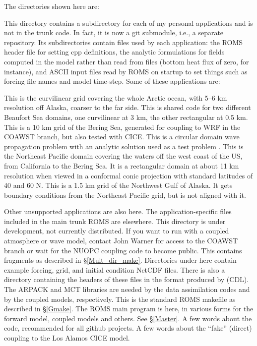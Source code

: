The directories shown here are:
\begin{klist}
   This directory contains a subdirectory for each of
  my personal applications and is not in the trunk code. In fact,
  it is now a git submodule, i.e., a separate repository. Its
  subdirectories contain files used by each application: the ROMS
  header file for setting cpp definitions, the analytic formulations
  for fields computed in the model rather than read from files
  (bottom heat flux of zero, for instance), and ASCII input files
  read by ROMS on startup to set things such as forcing file names
  and model time-step. Some of these applications are:
\begin{klist}
   This is the curvilinear grid covering the whole
    Arctic ocean, with 5--6 km resolution off Alaska, coarser to the
    far side.
   This is shared code for two different Beaufort Sea
    domains, one curvilinear at 3 km, the other rectangular at 0.5 km.
   This is a 10 km grid of the Bering Sea, generated for
    coupling to WRF in the COAWST branch, but also tested with CICE.
   This is a circular domain wave propagation problem
    with an analytic solution used as a test problem \citep{Lamb32}.
   This is the Northeast Pacific domain covering the
    waters off the west coast of the US, from California to the
    Bering Sea. It is a rectangular domain at about 11 km resolution
    when viewed in a conformal conic projection with standard
    latitudes of 40 and 60 N.
   This is a 1.5 km grid of the Northwest Gulf of Alaska. It
    gets boundary conditions from the Northeast Pacific grid, but
    is not aligned with it.
\end{klist}
  Other unsupported applications are also here. The application-specific
  files included in the main trunk ROMS are elsewhere.
   This directory is under development, not
    currently distributed. If you want to run with a coupled atmosphere
    or wave model, contact John Warner for access to the COAWST
    branch or wait for the NUOPC coupling code to become public.
   This contains  fragments as described in
    \S\ref{Mult_dir_make}.
   Directories under here contain example forcing, grid,
    and initial condition NetCDF files. There is also a directory
    containing the headers of these files in the format produced
    by  (CDL).
   The ARPACK and MCT libraries are needed by the data
    assimilation codes and by the coupled models, respectively.
   This is the standard ROMS makefile as described
    in \S\ref{Gmake}.
   The ROMS main program is here, in various forms for
    the forward model, coupled models and others. See \S\ref{Master}.
   A few words about the code, recommended for all github
    projects.
   A few words about the ``fake'' (direct) coupling
    to the Los Alamos CICE model.


\end{klist}
